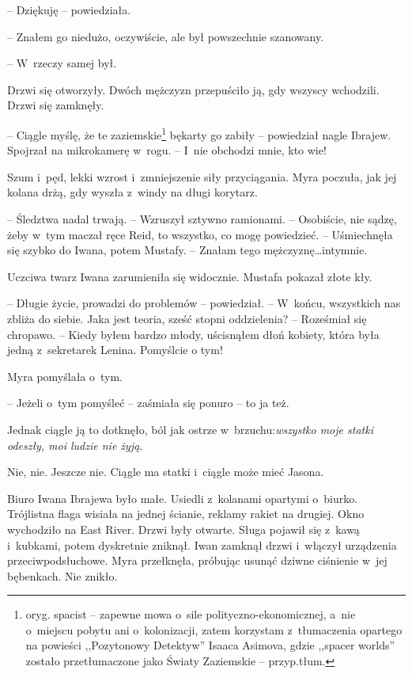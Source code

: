 \documentclass[oneside,polish,11pt,sfheadings]{mwbk}
\begin{document}
-- Dziękuję -- powiedziała.

-- Znałem go niedużo, oczywiście, ale był powszechnie szanowany.

-- W~rzeczy samej był.

Drzwi się otworzyły. Dwóch mężczyzn przepuściło ją, gdy wszyscy
wchodzili. Drzwi się zamknęły.

-- Ciągle myślę, że te zaziemskie\footnote{ oryg. spacist -- zapewne mowa o~sile
polityczno-ekonomicznej, a~nie o~miejscu pobytu ani o~kolonizacji, zatem
korzystam z~tłumaczenia opartego na powieści ,,Pozytonowy Detektyw''
Isaaca Asimova, gdzie ,,spacer worlds'' zostało przetłumaczone jako
Światy Zaziemskie -- przyp.tłum.} bękarty go zabiły -- powiedział nagle
Ibrajew. Spojrzał na mikrokamerę w~rogu. -- I~nie obchodzi mnie, kto wie!

Szum i~pęd, lekki wzrost i~zmniejszenie siły przyciągania. Myra poczuła,
jak jej kolana drżą, gdy wyszła z~windy na długi korytarz.

-- Śledztwa nadal trwają. -- Wzruszył sztywno ramionami. -- Osobiście, nie
sądzę, żeby w~tym maczał ręce Reid, to wszystko, co mogę powiedzieć. -- Uśmiechnęła się szybko do Iwana, potem Mustafy. -- Znałam tego
mężczyznę\ldots intymnie.

Uczciwa twarz Iwana zarumieniła się widocznie. Mustafa pokazał złote
kły.

-- Długie życie, prowadzi do problemów -- powiedział. -- W~końcu,
wszystkich nas zbliża do siebie. Jaka jest teoria, sześć stopni
oddzielenia? -- Roześmiał się chropawo. -- Kiedy byłem bardzo młody,
uścisnąłem dłoń kobiety, która była jedną z~sekretarek Lenina. Pomyślcie
o tym!

Myra pomyślała o~tym. 

-- Jeżeli o~tym pomyśleć -- zaśmiała się ponuro -- to
ja też.

Jednak ciągle ją to dotknęło, ból jak ostrze w~brzuchu:\textit{wszystko
moje statki odeszły, moi ludzie nie żyją.}

Nie, nie. Jeszcze nie. Ciągle ma statki i~ciągle może mieć Jasona.

Biuro Iwana Ibrajewa było małe. Usiedli z~kolanami opartymi o~biurko.
Trójlistna flaga wisiała na jednej ścianie, reklamy rakiet na drugiej.
Okno wychodziło na East River. Drzwi były otwarte. Sługa pojawił się z~kawą i~kubkami, potem dyskretnie zniknął. Iwan zamknął drzwi i~włączył
urządzenia przeciwpodsłuchowe. Myra przełknęła, próbując usunąć dziwne
ciśnienie w~jej bębenkach. Nie znikło.
\end{document}
